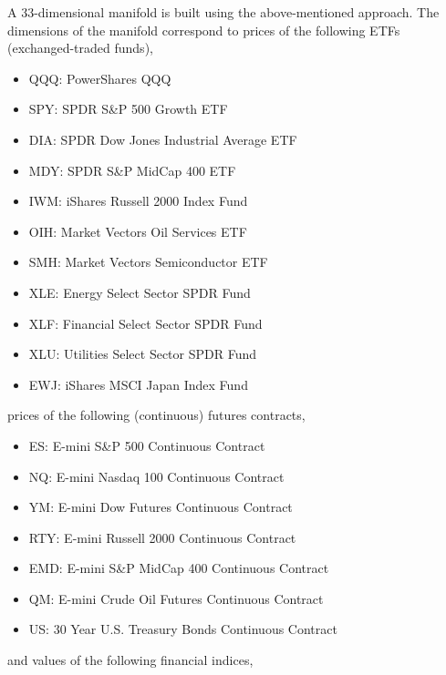 \documentclass{article}
\begin{document}
A 33-dimensional manifold is built using the above-mentioned
approach. The dimensions of the manifold correspond to prices of the
following ETFs (exchanged-traded funds),

\begin{itemize}
    \item[] QQQ: PowerShares QQQ 
    \item[] SPY: SPDR S\&P 500 Growth ETF 
    \item[] DIA: SPDR Dow Jones Industrial Average ETF 
    \item[] MDY: SPDR S\&P MidCap 400 ETF 
    \item[] IWM: iShares Russell 2000 Index Fund 
    \item[] OIH: Market Vectors Oil Services ETF 
    \item[] SMH: Market Vectors Semiconductor ETF 
    \item[] XLE: Energy Select Sector SPDR Fund 
    \item[] XLF: Financial Select Sector SPDR Fund 
    \item[] XLU: Utilities Select Sector SPDR Fund 
    \item[] EWJ: iShares MSCI Japan Index Fund
\end{itemize}

prices of the following (continuous) futures contracts,

\begin{itemize}
    \item[] ES:  E-mini S\&P 500 Continuous Contract 
    \item[] NQ:  E-mini Nasdaq 100 Continuous Contract 
    \item[] YM:  E-mini Dow Futures Continuous Contract 
    \item[] RTY: E-mini Russell 2000 Continuous Contract 
    \item[] EMD: E-mini S\&P MidCap 400 Continuous Contract 
    \item[] QM:  E-mini Crude Oil Futures Continuous Contract 
    \item[] US:  30 Year U.S. Treasury Bonds Continuous Contract    
\end{itemize}

and values of the following financial indices,
\end{document}
